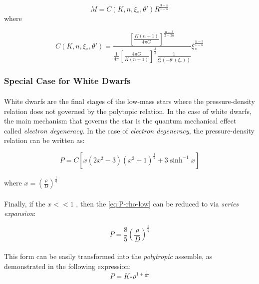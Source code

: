 \documentclass[letterpaper,12pt]{article}
\begin{document}
\begin{equation}
    \label{eq:mass-radius-prop}
    M = C(K, n, \xi_*, \theta') R^{\frac{3-n}{1-n}} 
\end{equation}
where 

\begin{equation}
    \label{eq:const-prop}
  \boxed{  C(K, n, \xi_*, \theta') = \frac{ \left[\frac{K \left(n+1\right)}{4 \pi G}\right]^{\frac{n-3}{2 - 2n}} }{\frac{1}{4 \pi} \left[\frac{4 \pi G}{K \left(n+1\right)}\right]^{\frac{3}{2}}  \frac{1}{\xi_*^2\left(-\theta'(\xi_*)\right)}} \xi_*^{\frac{n-3}{1-n}} }
\end{equation}

\subsubsection{Special Case for White Dwarfs}

\paragraph{} White dwarfs are the final stages of the low-mass stars where the pressure-density relation does not governed by the polytopic relation. In the case of white dwarfs, the main mechanism that governs the star is the quantum mechanical effect called \textit{electron degeneracy}. In the case of \textit{electron degeneracy}, the pressure-density relation can be written as:

\begin{equation}
    \label{eq:P-rho-low}
    P = C \left[x \left(2x^2-3\right)\left(x^2+1\right)^{\frac{1}{2}}+3\sinh^{-1}{x}\right]
\end{equation}

where $x = \left(\frac{\rho}{D}\right)^{\frac{1}{q}}$

\paragraph{} Finally, if the $x<<1$ , then the \eqref{eq:P-rho-low} can be reduced to via \textit{series expansion}:

\begin{equation*}
    P = \frac{8}{5} \left(\frac{\rho}{D}\right)^{\frac{5}{q}}
\end{equation*}

\paragraph{} This form can be easily transformed into the \textit{polytropic} assemble, as demonstrated in the following expression:
\begin{equation}
    \label{eq:P-rho-low-reduced}
    P = K_* \rho^{1 + \frac{1}{n_*}}
\end{equation}
\end{document}
